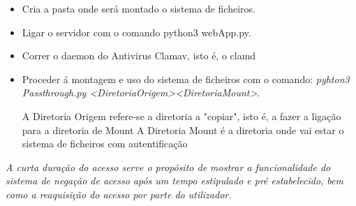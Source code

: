 \begin{itemize}
\item Cria a pasta onde será montado o sistema de ficheiros.\newline
\item Ligar o servidor com o comando python3 webApp.py.\newline
\item Correr o daemon do Antivirus Clamav, isto é, o clamd
\item Proceder á montagem e uso do sistema de ficheiros com o comando: \textit{pyhton3 Passthrough.py \textless DiretoriaOrigem\textgreater \textless DiretoriaMount\textgreater}.\newline


A Diretoria Origem refere-se a diretoria a "copiar", isto é, a fazer a ligação para a diretoria de Mount
A Diretoria Mount é a diretoria onde vai estar o sistema de ficheiros com autentificação\newline
\end{itemize}

\textit{ A curta duração do acesso serve o propósito de mostrar a funcionalidade do sistema de negação de acesso após um tempo estipulado e pré estabelecido, bem como a reaquisição do acesso por parte do utilizador.} 








